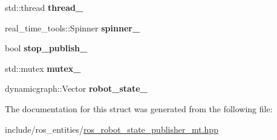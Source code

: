 \begin{DoxyCompactItemize}
std\+::thread {\bfseries thread\+\_\+}
\item 
\mbox{\label{structdynamic__graph_1_1RosRobotStatePublisherMtInternal_aa4aa01f9d16725c5e314384111ff563e}} 
real\+\_\+time\+\_\+tools\+::\+Spinner {\bfseries spinner\+\_\+}
\item 
\mbox{\label{structdynamic__graph_1_1RosRobotStatePublisherMtInternal_a8119b11fca598b99c4af814a10778c2c}} 
bool {\bfseries stop\+\_\+publish\+\_\+}
\item 
\mbox{\label{structdynamic__graph_1_1RosRobotStatePublisherMtInternal_a3103d4fb6f8c909b61dd172424ad462d}} 
std\+::mutex {\bfseries mutex\+\_\+}
\item 
\mbox{\label{structdynamic__graph_1_1RosRobotStatePublisherMtInternal_a50521c986af60cc19754eeba85f17345}} 
dynamicgraph\+::\+Vector {\bfseries robot\+\_\+state\+\_\+}
\end{DoxyCompactItemize}


The documentation for this struct was generated from the following file\+:\begin{DoxyCompactItemize}
\item 
include/ros\+\_\+entities/\hyperlink{ros__robot__state__publisher__mt_8hpp}{ros\+\_\+robot\+\_\+state\+\_\+publisher\+\_\+mt.\+hpp}\end{DoxyCompactItemize}
